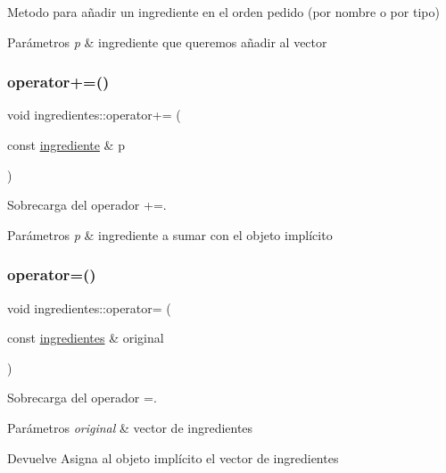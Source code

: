 Metodo para añadir un ingrediente en el orden pedido (por nombre o por tipo) 


\begin{DoxyParams}{Parámetros}
{\em p} & ingrediente que queremos añadir al vector \\
\hline
\end{DoxyParams}
\mbox{\label{classingredientes_a24ea8c982877578bff6e0f450c4b79a6}} 
\subsubsection{\texorpdfstring{operator+=()}{operator+=()}}
{\footnotesize\ttfamily void ingredientes\+::operator+= (\begin{DoxyParamCaption}\item[{const \hyperlink{classingrediente}{ingrediente} \&}]{p }\end{DoxyParamCaption})}



Sobrecarga del operador +=. 


\begin{DoxyParams}{Parámetros}
{\em p} & ingrediente a sumar con el objeto implícito \\
\hline
\end{DoxyParams}
\mbox{\label{classingredientes_ab5478a896ab96486a86dfb1b5707c565}} 
\subsubsection{\texorpdfstring{operator=()}{operator=()}}
{\footnotesize\ttfamily void ingredientes\+::operator= (\begin{DoxyParamCaption}\item[{const \hyperlink{classingredientes}{ingredientes} \&}]{original }\end{DoxyParamCaption})}



Sobrecarga del operador =. 


\begin{DoxyParams}{Parámetros}
{\em original} & vector de ingredientes \\
\hline
\end{DoxyParams}
\begin{DoxyReturn}{Devuelve}
Asigna al objeto implícito el vector de ingredientes 
\end{DoxyReturn}
\mbox{\label{classingredientes_a4d26f4035049ca7fb9506df48895cc4f}} 
